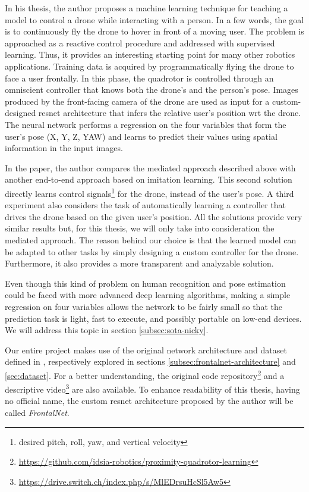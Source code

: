 In his thesis, the author proposes a machine learning technique for teaching a model to control a drone while interacting with a person. In a few words, the goal is to continuously fly the drone to hover in front of a moving user. The problem is approached as a reactive control procedure and addressed with supervised learning. Thus, it provides an interesting starting point for many other robotics applications. Training data is acquired by programmatically flying the drone to face a user frontally. In this phase, the quadrotor is controlled through an omniscient controller that knows both the drone's and the person's pose. Images produced by the front-facing camera of the drone are used as input for a custom-designed \gls{resnet} architecture that infers the relative user's position \gls{wrt} the drone. The neural network performs a regression on the four variables that form the user's pose (X, Y, Z, YAW) and learns to predict their values using spatial information in the input images.

In the paper, the author compares the mediated approach described above with another end-to-end approach based on imitation learning. This second solution directly learns control signals\footnote{desired pitch, roll, yaw, and vertical velocity} for the drone, instead of the user's pose. A third experiment also considers the task of automatically learning a controller that drives the drone based on the given user's position. All the solutions provide very similar results but, for this thesis, we will only take into consideration the mediated approach. The reason behind our choice is that the learned model can be adapted to other tasks by simply designing a custom controller for the drone. Furthermore, it also provides a more transparent and analyzable solution.

Even though this kind of problem on human recognition and pose estimation could be faced with more advanced deep learning algorithms, making a simple regression on four variables allows the network to be fairly small so that the prediction task is light, fast to execute, and possibly portable on low-end devices. We will address this topic in section \ref{subsec:sota-nicky}.

\medskip

Our entire project makes use of the original network architecture and dataset defined in \cite{mantegazza2019visionbased}, respectively explored in sections \ref{subsec:frontalnet-architecture} and \ref{sec:dataset}. For a better understanding, the original code repository\footnote{\url{https://github.com/idsia-robotics/proximity-quadrotor-learning}} and a descriptive video\footnote{\url{https://drive.switch.ch/index.php/s/MlEDrsuHcSl5Aw5}} are also available. To enhance readability of this thesis, having no official name, the custom \gls{resnet} architecture proposed by the author will be called \textit{FrontalNet}.


